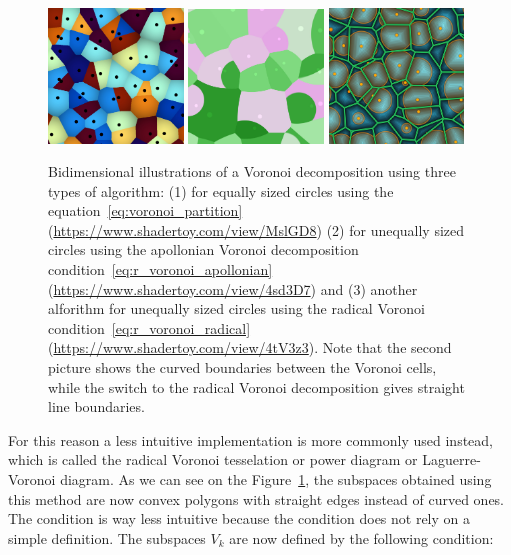 \documentclass[main]{subfiles}
\begin{document}
\begin{figure}
    \centering
    \includegraphics[width=0.32\textwidth]{figures/3-fastsim/voronoi.jpg}
    \includegraphics[width=0.32\textwidth]{figures/3-fastsim/voronoi_apollonian.jpg}
    \includegraphics[width=0.32\textwidth]{figures/3-fastsim/voronoi_radical.jpg}
    \caption{Bidimensional illustrations of a Voronoi decomposition using three types of algorithm: (1) for equally sized circles using the equation~\ref{eq:voronoi_partition} (\url{https://www.shadertoy.com/view/MslGD8}) (2) for unequally sized circles using the apollonian Voronoi decomposition condition~\ref{eq:r_voronoi_apollonian} (\url{https://www.shadertoy.com/view/4sd3D7}) and (3) another alforithm for unequally sized circles using the radical Voronoi condition~\ref{eq:r_voronoi_radical} (\url{https://www.shadertoy.com/view/4tV3z3}). Note that the second picture shows the curved boundaries between the Voronoi cells, while the switch to the radical Voronoi decomposition gives straight line boundaries.}\label{fgr:voronoi_illustration}
  \end{figure}

For this reason a less intuitive implementation is more commonly used instead, which is called the radical Voronoi tesselation or power diagram or Laguerre-Voronoi diagram.\cite{aurenhammer_1987} As we can see on the Figure~\ref{fgr:voronoi_illustration}, the subspaces obtained using this method are now convex polygons with straight edges instead of curved ones. The condition is way less intuitive because the condition does not rely on a simple definition. The subspaces $V_k$ are now defined by the following condition:
\end{document}
